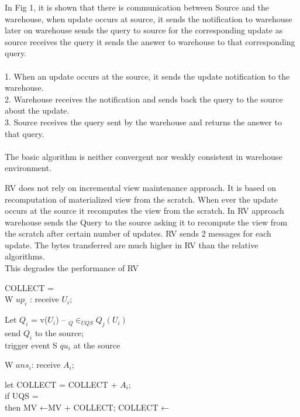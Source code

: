 \documentclass[12pt]{report}
\begin{document}
\begin{description}[font=$\bullet$~\normalfont\scshape\color{blue!50!black}]
\item[Basic Algorithm] In Fig 1, it is shown that there 
is communication between Source and  the  warehouse,  when  update  occurs  at  source,  it  sends the  notification  to  warehouse  later  on  warehouse  sends  the query  to  source  for  the  corresponding  update  as  source  
receives the query it sends the answer to warehouse to that corresponding query.\\
\\1. When  an  update  occurs at  the  source,  it  sends  the update notification to the warehouse. 
\\2. Warehouse  receives  the  notification  and  sends  
back the query to the source about the update. 
\\3. Source receives the query    sent    by    the    
warehouse and returns the answer to that query.  
\\\\The   basic   algorithm   is   neither   convergent   nor   weakly   
consistent in warehouse environment. \cite{saudi}
\item[Recompute View] RV does not rely on incremental view maintenance 
approach. It is based on recomputation of materialized view 
from the scratch. When ever the update occurs at the source 
it recomputes the view from the scratch. In RV approach 
warehouse sends the Query to the source asking it to 
recompute the view from the scratch after certain number of 
updates. RV sends 2 messages for each update. The bytes 
transferred are much higher
 in RV than the relative 
algorithms. \\This degrades the performance of RV \cite{saudi}
\\\item[Eager Compensating Algorithm]
COLLECT =  
\\W $up_i$
: receive $U_i$; 
\begin{center}
Let $Q_i$
= v($U_i$) – 
$_{Q}\in_{UQS}Q_j(U_i) $
\\send $Q_i$ to the source; 
\\trigger event S $qu_i$ at the source 
\end{center}
W $ans_i$: receive $A_i$; 
\begin{center}
        let COLLECT = COLLECT + $A_i$; 
\\        if UQS =
           \\then { MV ←MV + COLLECT; COLLECT ←} 

\end{center}
\end{description}
\end{document}
